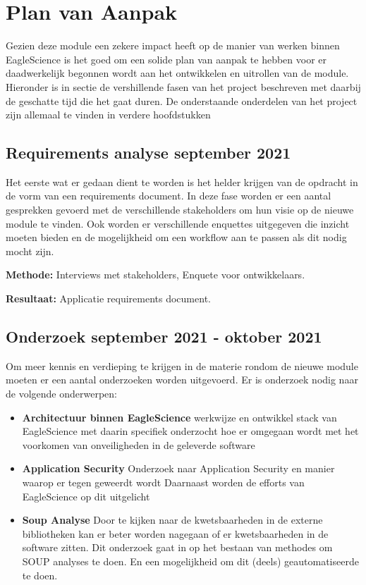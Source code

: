 
\chapter{Plan van Aanpak}\label{ch:planvanaanpak} %
Gezien deze module een zekere impact heeft op de manier van werken binnen EagleScience is het goed om een solide plan van aanpak te hebben voor er daadwerkelijk begonnen wordt aan het ontwikkelen en uitrollen van de module. Hieronder is in sectie de vershillende fasen van het project beschreven met daarbij de geschatte tijd die het gaat duren. De onderstaande onderdelen van het project zijn allemaal te vinden in verdere hoofdstukken

\section{Requirements analyse \textbf{september 2021}}\label{sec:requirements-analyse}
Het eerste wat er gedaan dient te worden is het helder krijgen van de opdracht in de vorm van een requirements document. In deze fase worden er een aantal gesprekken gevoerd met de verschillende stakeholders om hun visie op de nieuwe module te vinden. Ook worden er verschillende enquettes uitgegeven die inzicht moeten bieden en de mogelijkheid om een workflow aan te passen als dit nodig mocht zijn.

\textbf{Methode:} Interviews met stakeholders, Enquete voor ontwikkelaars.

\textbf{Resultaat:} Applicatie requirements document.

\section{Onderzoek \textbf{september 2021 - oktober 2021 }}\label{sec:onderzoek}
Om meer kennis en verdieping te krijgen in de materie rondom de nieuwe module moeten er een aantal onderzoeken worden uitgevoerd. Er is onderzoek nodig naar de volgende onderwerpen:
\begin{itemize}
    \item \textbf{Architectuur binnen EagleScience} werkwijze en ontwikkel stack van EagleScience met daarin specifiek onderzocht hoe er omgegaan wordt met het voorkomen van onveiligheden in de geleverde software
    \item \textbf{Application Security} Onderzoek naar Application Security en manier waarop er tegen geweerdt wordt Daarnaast worden de efforts van EagleScience op dit uitgelicht
    \item \textbf{Soup Analyse} Door te kijken naar de kwetsbaarheden in de externe bibliotheken kan er beter worden nagegaan of er kwetsbaarheden in de software zitten. Dit onderzoek gaat in op het bestaan van methodes om SOUP analyses te doen. En een mogelijkheid om dit (deels) geautomatiseerde te doen.
\end{itemize}

